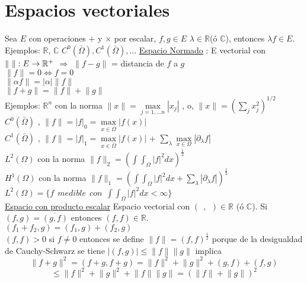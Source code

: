 \documentclass[a4paper,10pt]{book}
\begin{document}
\section{Espacios vectoriales}
Sea $E$ con operaciones $+$ y $\times$  por escalar, $f,g \in E$  $\lambda\in \mathbb{R}$(ó $\mathbb{C}$),
entonces   $\lambda f \in E$.
Ejemplos:  $\mathbb{R}$, $\mathbb{C}$  $C^0(\bar{\Omega}),C^1(\bar{\Omega}),...$
\underline{Espacio Normado} : E vectorial con $\Arrowvert \ \Arrowvert:E\rightarrow \mathbb{R}^{+}$
$\Rightarrow$  $\lVert f-g \rVert$ = distancia de $f$ a $g$\\
$\lVert f \rVert =0  \Leftrightarrow f = 0 $ \\
$\lVert \alpha f \rVert =  | \alpha |\lVert f \rVert$ \\ 
$\lVert  f + g  \rVert =  \lVert f \rVert +\lVert g  \rVert$ \\ 
Ejemplos: $\mathbb{R}^n$ con la norma $\lVert x \rVert= \underset{j=1,... n}{\max} |x_j|$ , o, $\lVert x\rVert=\left( \sum_j x_j^ 2 \right) ^{1/2}$\\
$C^0(\bar{\Omega})$ , $\lVert f \rVert = |f|_0 = \underset{x\in \bar{\Omega} }{\max} | f(x)|$\\
$C^1(\bar{\Omega})$ , $\lVert f \rVert = |f|_1 = \underset{x\in \bar{\Omega} }{\max} | f(x)|$ + 
$\underset{\lambda}{\sum} \underset{x\in\Omega }{\max} \left| \partial_{\lambda} f \right|$ \\
$L^2(\Omega)$ con la norma $\lVert f \rVert_2= \left( \int \int_\Omega |f|^2 dx \right)^\frac{1}{2}$\\ 
$H^1(\Omega)$ con la norma $\lVert f \rVert_1= \left( \int \int_\Omega |f|^2 dx + \underset{\lambda}{\sum}  \left| \partial_{\lambda} f \right| \right)^\frac{1}{2}$\\
$L^2(\Omega) = \{ f \ \ medible\ \ con \ \ \int \int_\Omega |f|^2 dx< \infty \} $\\  

\underline{Espacio con producto escalar}
Espacio vectorial con $( \ \ , \ \ )  \in \mathbb{R}$ (ó $\mathbb{C}$). Si $(f,g)=\overline{(g,f)}$   
entonces $(f,f)\in \mathbb{R}$. \\

$(f_1+f_2,g)=(f_1,g)+(f_2,g)$  \\
$(f,f)>0$ si $f\neq 0$ entonces se define $\lVert f \rVert = (f,f)^{\frac{1}{2}}$ porque
de la desigualdad de Cauchy-Schwarz se tiene
$|(f,g)| \leq \lVert f \rVert \lVert g\rVert$ implica \\

\[\lVert f+g \rVert^2 = (f+g,f+g) =\lVert f\rVert^2 + \lVert g\rVert^2 + (g,f)+(f,g)\]
\[ \leq \lVert f\rVert^2 + \lVert g\rVert^2 + \lVert f \rVert\lVert g \rVert= \left( \lVert f\rVert + \lVert g\rVert  \right)^2 \]
\end{document}
